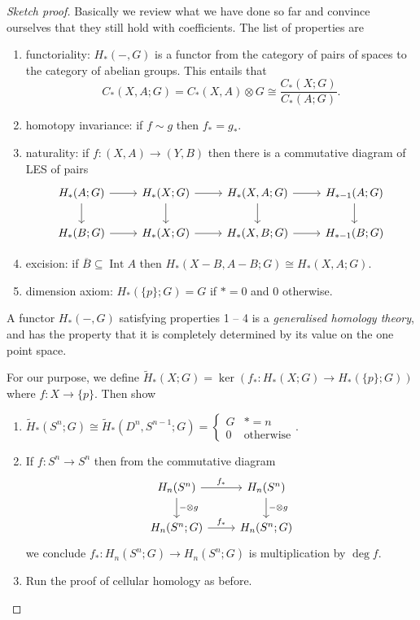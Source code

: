 \documentclass[a4paper]{article}
\DeclareMathOperator{\Int}{Int} %
\begin{document}
\begin{proof}[Sketch proof]
  Basically we review what we have done so far and convince ourselves that they still hold with coefficients. The list of properties are
  \begin{enumerate}
  \item functoriality: \(H_*(-, G)\) is a functor from the category of pairs of spaces to the category of abelian groups. This entails that
    \[
      C_*(X, A; G) = C_*(X, A) \otimes G \cong \frac{C_*(X; G)}{C_*(A; G)}.
    \]
  \item homotopy invariance: if \(f \sim g\) then \(f_* = g_*\).
  \item naturality: if \(f: (X, A) \to (Y, B)\) then there is a commutative diagram of LES of pairs
    \[
      \begin{tikzcd}
        H_*(A; G) \ar[r] \ar[d] & H_*(X; G) \ar[r] \ar[d] & H_*(X, A; G) \ar[r] \ar[d] & H_{* - 1}(A; G) \ar[d] \\
        H_*(B; G) \ar[r] & H_*(X; G) \ar[r] & H_*(X, B; G) \ar[r] & H_{* - 1}(B; G)
      \end{tikzcd}
    \]
  \item excision: if \(\overline B \subseteq \Int A\) then \(H_*(X - B, A - B; G) \cong H_*(X, A; G)\).
  \item dimension axiom: \(H_*(\{p\}; G) = G\) if \(* = 0\) and \(0\) otherwise.
  \end{enumerate}
  A functor \(H_*(-, G)\) satisfying properties 1 -- 4 is a \emph{generalised homology theory}, and has the property that it is completely determined by its value on the one point space.

  For our purpose, we define \(\widetilde H_*(X; G) = \ker(f_*: H_*(X; G) \to H_*(\{p\}; G))\) where \(f: X \to \{p\}\). Then show
  \begin{enumerate}
  \item \(\widetilde H_*(S^n; G) \cong \widetilde H_*(D^n, S^{n - 1}; G) =
    \begin{cases}
      G & * = n \\
      0 & \text{otherwise}
    \end{cases}
    \).
  \item If \(f: S^n \to S^n\) then from the commutative diagram
    \[
      \begin{tikzcd}
        H_n(S^n) \ar[r, "f_*"] \ar[d, "- \otimes g"] & H_n(S^n) \ar[d, "- \otimes g"] \\
        H_n(S^n; G) \ar[r, "f_*"] & H_n(S^n; G)
      \end{tikzcd}
    \]
    we conclude \(f_*: H_n(S^n; G) \to H_n(S^n; G)\) is multiplication by \(\deg f\).
  \item Run the proof of cellular homology as before.
  \end{enumerate}
\end{proof}
\end{document}
